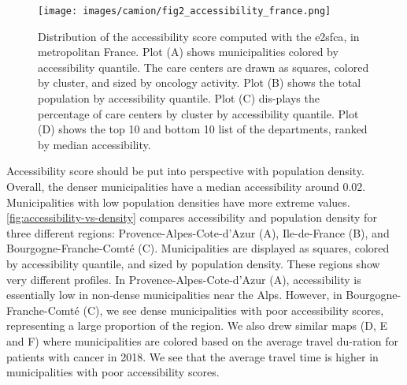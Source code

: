 \begin{figure}[h]
    \texttt{[image: images/camion/fig2\_accessibility\_france.png]}
    \centering
    \caption{
        Distribution of the accessibility score computed with the \ac{e2sfca}, in metropolitan France. Plot (A) shows municipalities colored by accessibility quantile. The care centers are drawn as squares, colored by cluster, and sized by oncology activity. Plot (B) shows the total population by accessibility quantile. Plot (C) dis-plays the percentage of care centers by cluster by accessibility quantile. Plot (D) shows the top 10 and bottom 10 list of the departments, ranked by median accessibility.
    }
    \label{fig:accessibility-france}
\end{figure}

Accessibility score should be put into perspective with population density. Overall, the denser municipalities have a median accessibility around 0.02. Municipalities with low population densities have more extreme values.  \cref{fig:accessibility-vs-density} compares accessibility and population density for three different regions: Provence-Alpes-Cote-d'Azur (A), Ile-de-France (B), and Bourgogne-Franche-Comté (C). Municipalities are displayed as squares, colored by accessibility quantile, and sized by population density. These regions show very different profiles. In Provence-Alpes-Cote-d'Azur (A), accessibility is essentially low in non-dense municipalities near the Alps. However, in Bourgogne-Franche-Comté (C), we see dense municipalities with poor accessibility scores, representing a large proportion of the region. We also drew similar maps (D, E and F) where municipalities are colored based on the average travel du-ration for patients with cancer in 2018. We see that the average travel time is higher in municipalities with poor accessibility scores.

